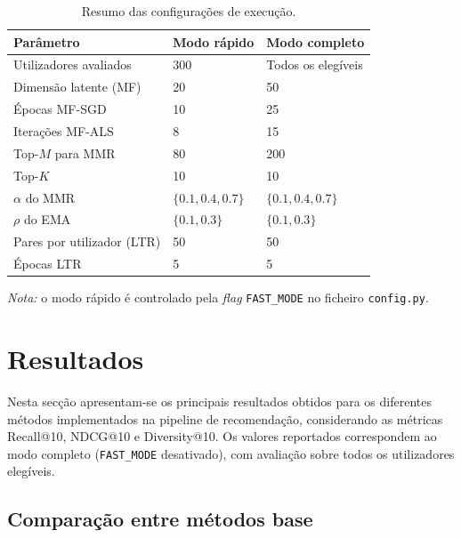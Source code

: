 \documentclass[10pt]{article}
\begin{document}
\begin{table}[H]
\centering
\small
\renewcommand{\arraystretch}{1.2}
\begin{tabular}{p{} p{} p{}}
\toprule
\textbf{Parâmetro} & \textbf{Modo rápido} & \textbf{Modo completo} \\
\midrule
Utilizadores avaliados & 300 & Todos os elegíveis \\
Dimensão latente (MF) & 20 & 50 \\
Épocas MF-SGD & 10 & 25 \\
Iterações MF-ALS & 8 & 15 \\
Top-\(M\) para MMR & 80 & 200 \\
\midrule
Top-\(K\) & 10 & 10 \\
\(\alpha\) do MMR & \(\{0.1,0.4,0.7\}\) & \(\{0.1,0.4,0.7\}\) \\
\(\rho\) do EMA & \(\{0.1,0.3\}\) & \(\{0.1,0.3\}\) \\
Pares por utilizador (LTR) & 50 & 50 \\
Épocas LTR & 5 & 5 \\
\bottomrule
\end{tabular}
\caption{Resumo das configurações de execução.}
\label{tab:config_execucao}
\end{table}
\noindent\textit{Nota:} o modo rápido é controlado pela \textit{flag} \texttt{FAST\_MODE} no ficheiro \texttt{config.py}.

















\section{Resultados}

Nesta secção apresentam-se os principais resultados obtidos para os diferentes métodos implementados na pipeline de recomendação, considerando as métricas Recall@10, NDCG@10 e Diversity@10. Os valores reportados correspondem ao modo completo (\texttt{FAST\_MODE} desativado), com avaliação sobre todos os utilizadores elegíveis.

\subsection{Comparação entre métodos base}
\end{document}
